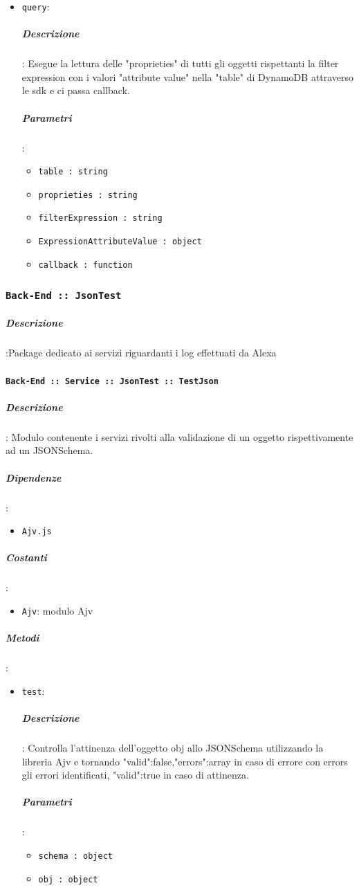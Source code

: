 \documentclass[../DefinizioneDiProdotto_v2.0.0.tex]{subfiles}
\begin{document}
\begin{itemize}
\item \texttt{query}:
\subparagraph{Descrizione}: Esegue la lettura delle "proprieties" di tutti gli oggetti rispettanti la filter expression con i valori "attribute value" nella "table" di DynamoDB attraverso le sdk e ci passa callback.
\subparagraph{Parametri}:
\begin{itemize}
	\item \texttt{table : string}
	\item \texttt{proprieties : string}
	\item \texttt{filterExpression : string}
	\item \texttt{ExpressionAttributeValue : object}
	\item \texttt{callback : function}
\end{itemize}
\end{itemize}


\subsubsection{\texttt{Back-End :: JsonTest}}
\subparagraph{Descrizione}:Package dedicato ai servizi riguardanti i log effettuati da Alexa

\paragraph{\texttt{Back-End :: Service :: JsonTest :: TestJson}}
\subparagraph{Descrizione}: Modulo contenente i servizi rivolti alla validazione di un oggetto rispettivamente ad un JSONSchema.
\subparagraph{Dipendenze}:
\begin{itemize}
	\item \texttt{Ajv.js}
\end{itemize}
\subparagraph{Costanti}:
\begin{itemize}
	\item \texttt{Ajv}: modulo Ajv
\end{itemize}
\subparagraph{Metodi}:\begin{itemize}
\item \texttt{test}:
\subparagraph{Descrizione}: Controlla l'attinenza dell'oggetto obj allo JSONSchema utilizzando la libreria Ajv e tornando {"valid":false,"errors":array} in caso di errore con errors gli errori identificati, {"valid":true} in caso di attinenza.
\subparagraph{Parametri}:
\begin{itemize}
	\item \texttt{schema : object}
	\item \texttt{obj : object}
\end{itemize}
\end{itemize}
\end{document}
